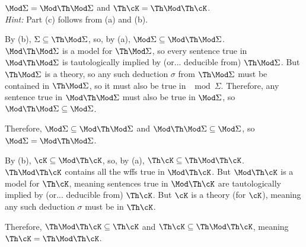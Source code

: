 \begin{problem}[3]
\begin{enumalph}
\begin{Answer}
    \end{Answer}
    \item $\Mod \Sigma = \Mod \Th \Mod \Sigma$ and $\Th \cK = \Th \Mod \Th \cK$.\\
    \textit{Hint:} Part (c) follows from (a) and (b).
    \begin{Answer}
      By (b), $\Sigma \subseteq \Th \Mod \Sigma$, so,
      by (a), $\Mod \Sigma \subseteq \Mod \Th \Mod \Sigma$. \\
      $\Mod \Th \Mod \Sigma$ is a model for $\Th \Mod \Sigma$,
      so every sentence true in $\Mod \Th \Mod \Sigma$ is tautologically
      implied by (or... deducible from) $\Th \Mod \Sigma$.
      But $\Th \Mod \Sigma$ is a theory, so any such deduction $\sigma$
      from $\Th \Mod \Sigma$ must be contained in $\Th \Mod \Sigma$,
      so it must also be true in $\mod \Sigma$.
      Therefore, any sentence true in $\Mod \Th \Mod \Sigma$ must also
      be true in $\Mod \Sigma$, so
      $\Mod \Th \Mod \Sigma \subseteq \Mod \Sigma$.

      \step
      Therefore, $\Mod \Sigma \subseteq \Mod \Th \Mod \Sigma$ and
      $\Mod \Th \Mod \Sigma \subseteq \Mod \Sigma$,
      so $\Mod \Sigma = \Mod \Th \Mod \Sigma$.


      \bigskip
      \step
      By (b), $\cK \subseteq \Mod \Th \cK$, so,
      by (a), $\Th \cK \subseteq \Th \Mod \Th \cK$. \\
      $\Th \Mod \Th \cK$ contains all the wffs true
      in $\Mod \Th \cK$. But $\Mod \Th \cK$ is a model for $\Th \cK$,
      meaning sentences true in $\Mod \Th \cK$ are tautologically implied by
      (or... deducible from) $\Th \cK$. But $\cK$ is a theory (for $\cK$),
      meaning any such deduction $\sigma$ must be in $\Th \cK$.

      \step
      Therefore, $\Th \Mod \Th \cK \subseteq \Th \cK$
      and $\Th \cK \subseteq \Th \Mod \Th \cK$,
      meaning $\Th \cK = \Th \Mod \Th \cK$.

    \end{Answer}
  \end{enumalph}
\end{problem}
